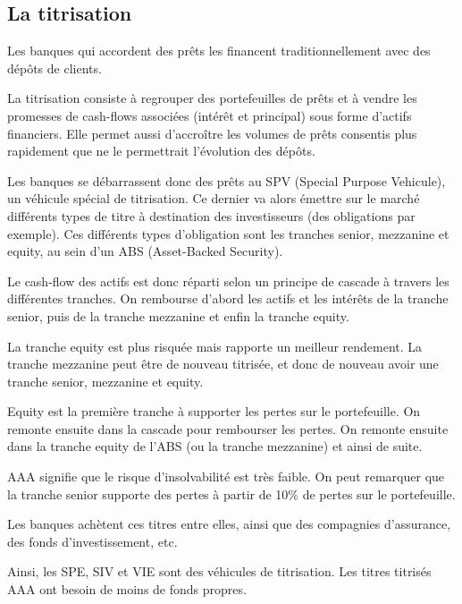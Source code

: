 	\subsection{La titrisation}
	
	Les banques qui accordent des prêts les financent traditionnellement avec des dépôts de clients. 

	La titrisation consiste à regrouper des portefeuilles de prêts et à vendre les promesses de cash-flows associées (intérêt et principal) sous forme d'actifs financiers. Elle permet aussi d'accroître les volumes de prêts consentis plus rapidement que ne le permettrait l'évolution des dépôts. 
	
	
	Les banques se débarrassent donc des prêts au SPV (Special Purpose Vehicule), un véhicule spécial de titrisation. Ce dernier va alors émettre sur le marché différents types de titre à destination des investisseurs (des obligations par exemple). Ces différents types d'obligation sont les tranches senior, mezzanine et equity, au sein d'un ABS (Asset-Backed Security).
	
	Le cash-flow des actifs est donc réparti selon un principe de cascade à travers les différentes tranches. On rembourse d'abord les actifs et les intérêts de la tranche senior, puis de la tranche mezzanine et enfin la tranche equity. 
	
	La tranche equity est plus risquée mais rapporte un meilleur rendement. La tranche mezzanine peut être de nouveau titrisée, et donc de nouveau avoir une tranche senior, mezzanine et equity.
	
	
	Equity est la première tranche à supporter les pertes sur le portefeuille. On remonte ensuite dans la cascade pour rembourser les pertes. On remonte ensuite dans la tranche equity  de l'ABS (ou la tranche mezzanine) et ainsi de suite.
		
	
	AAA signifie que le risque d'insolvabilité est très faible. On peut remarquer que la tranche senior supporte des pertes à partir de 10\% de pertes sur le portefeuille.
	
	
	Les banques achètent ces titres entre elles, ainsi que des compagnies d'assurance, des fonds d'investissement, etc.
	
	Ainsi, les SPE, SIV et VIE sont des véhicules de titrisation. Les titres titrisés AAA ont besoin de moins de fonds propres.
		
